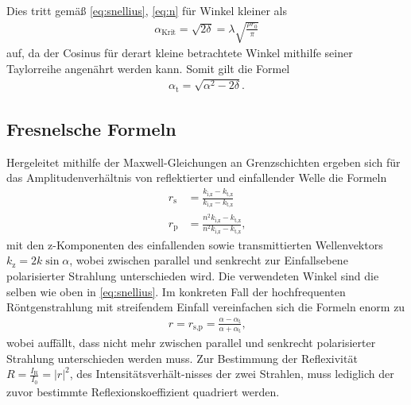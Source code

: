 \documentclass[12pt]{article}
\begin{document}
Dies tritt gemäß \autoref{eq:snellius}, \ref{eq:n} für Winkel kleiner als
\begin{align}
  \alpha_\text{Krit} = \sqrt{2 \delta} = \lambda \sqrt{\frac{\rho r_0}{\pi}}\label{eqn:a_krit}
\end{align}
auf, da der Cosinus für derart kleine betrachtete Winkel mithilfe seiner Taylorreihe angenährt werden kann.
Somit gilt die Formel
\begin{align}
  \alpha_\text{t} = \sqrt{\alpha^2-2\delta}\text{.}
\end{align}
\subsection{Fresnelsche Formeln}
Hergeleitet mithilfe der Maxwell-Gleichungen an Grenzschichten ergeben sich für das Amplitudenverhältnis von reflektierter und einfallender Welle die Formeln
\begin{align}
  r_\text{s} &= \frac{k_\text{i,z}-k_\text{t,z}}{k_\text{i,z}-k_\text{t,z}}\\
  r_\text{p} &= \frac{n^2k_\text{i,z}-k_\text{t,z}}{n^2k_\text{i,z}-k_\text{t,z}}\text{,}
\end{align}
mit den z-Komponenten des einfallenden sowie transmittierten Wellenvektors $k_\text{z}=2k\sin{\alpha}$, wobei zwischen parallel und senkrecht zur Einfallsebene polarisierter Strahlung unterschieden wird. Die verwendeten Winkel sind die selben wie oben in \autoref{eq:snellius}.
Im konkreten Fall der hochfrequenten Röntgenstrahlung mit streifendem Einfall vereinfachen sich die Formeln enorm zu
\begin{align}
  r = r_\text{s,p} = \frac{\alpha-\alpha_\text{t}}{\alpha+\alpha_\text{t}}\text{,}\label{eqn:fresnel}
\end{align}
wobei auffällt, dass nicht mehr zwischen parallel und senkrecht polarisierter Strahlung unterschieden werden muss.
Zur Bestimmung der Reflexivität $R=\frac{I_\text{R}}{I_0}=|r|^2$, des Intensitätsverhält-nisses der zwei Strahlen, muss lediglich der zuvor bestimmte Reflexionskoeffizient quadriert werden.
\end{document}
